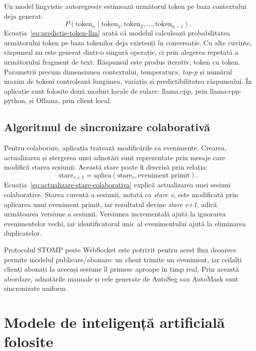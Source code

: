 Un model lingvistic autoregresiv estimează următorul token pe baza contextului deja generat:
\begin{equation}
    P(\text{token}_n \mid
    \text{token}_1, \text{token}_2, \ldots, \text{token}_{n-1}).
    \label{eq:predictie-token-llm}
\end{equation}
Ecuația~\ref{eq:predictie-token-llm} arată că modelul calculează probabilitatea următorului token pe baza tokenilor deja existenți în conversație. Cu alte cuvinte, răspunsul nu este generat dintr-o singură operație, ci prin alegerea repetată a următorului fragment de text.
Răspunsul este produs iterativ, token cu token.
Parametrii precum dimensiunea contextului, temperatura, \textit{top-p} și numărul maxim de tokeni controlează lungimea, variația și predictibilitatea răspunsului.
În aplicație sunt folosite două moduri locale de rulare: llama.cpp, prin llama-cpp-python, și Ollama, prin client local.

\subsection{Algoritmul de sincronizare colaborativă}
\label{subsec:algoritm-colaborativ}

Pentru colaborare, aplicația tratează modificările ca evenimente.
Crearea, actualizarea și ștergerea unei adnotări sunt reprezentate prin mesaje care modifică starea sesiunii.
Această stare poate fi descrisă prin relația:
\begin{equation}
    \text{stare}_{v+1} =
    \text{aplica}(\text{stare}_v, \text{eveniment primit}).
    \label{eq:actualizare-stare-colaborativa}
\end{equation}
Ecuația~\ref{eq:actualizare-stare-colaborativa} explică actualizarea unei sesiuni colaborative. Starea curentă a sesiunii, notată ca \textit{stare v}, este modificată prin aplicarea unui eveniment primit, iar rezultatul devine \textit{stare v+1}, adică următoarea versiune a sesiunii.
Versiunea incrementală ajută la ignorarea evenimentelor vechi, iar identificatorul unic al evenimentului ajută la eliminarea duplicatelor.

Protocolul STOMP peste WebSocket este potrivit pentru acest flux deoarece permite modelul publicare/abonare: un client trimite un eveniment, iar ceilalți clienți abonați la aceeași sesiune îl primesc aproape în timp real.
Prin această abordare, adnotările manuale și cele generate de AutoSeg sau AutoMask sunt sincronizate uniform.

\section{Modele de inteligență artificială folosite}
\label{sec:modele-ai-folosite}

